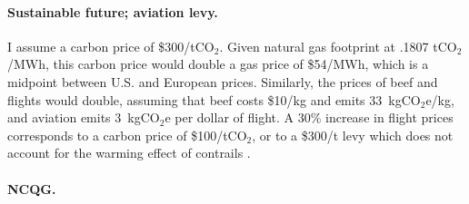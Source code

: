\paragraph{Sustainable future; aviation levy.}

I assume a carbon price of \$300/tCO$_\text{2}$. Given natural gas footprint at .1807 tCO$_\text{2}$/MWh, this carbon price would double a gas price of \$54/MWh, which is a midpoint between U.S. and European prices. Similarly, the prices of beef and flights would double, assuming that beef costs \$10/kg and emits 33~kgCO$_\text{2}$e/kg, and aviation emits 3~kgCO$_\text{2}$e per dollar of flight. A 30\% increase in flight prices corresponds to a carbon price of \$100/tCO$_\text{2}$, or to a \$300/t levy which does not account for the warming effect of contrails \citep{lee_contribution_2021}.


\paragraph{NCQG.} 


